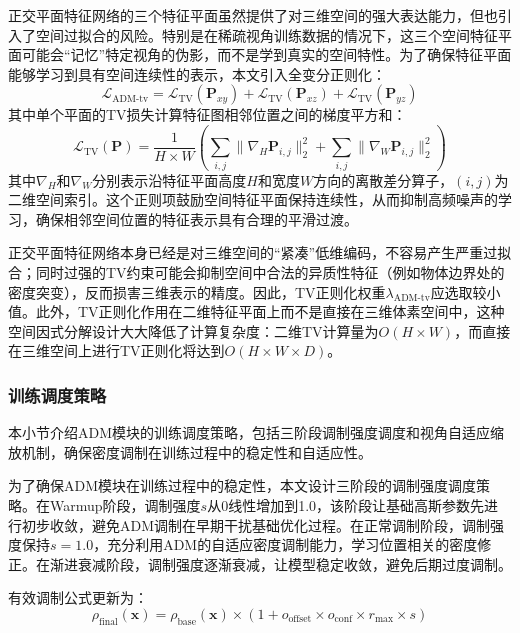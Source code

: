 正交平面特征网络的三个特征平面虽然提供了对三维空间的强大表达能力，但也引入了空间过拟合的风险。特别是在稀疏视角训练数据的情况下，这三个空间特征平面可能会“记忆”特定视角的伪影，而不是学到真实的空间特性。为了确保特征平面能够学习到具有空间连续性的表示，本文引入全变分正则化：
\begin{equation}
\mathcal{L}_{\text{ADM-tv}} = \mathcal{L}_{\text{TV}}(\mathbf{P}_{xy}) + \mathcal{L}_{\text{TV}}(\mathbf{P}_{xz}) + \mathcal{L}_{\text{TV}}(\mathbf{P}_{yz})
\end{equation}
其中单个平面的TV损失计算特征图相邻位置之间的梯度平方和：
\begin{equation}
\mathcal{L}_{\text{TV}}(\mathbf{P}) = \frac{1}{H \times W} \left( \sum_{i,j} \|\nabla_H \mathbf{P}_{i,j}\|_2^2 + \sum_{i,j} \|\nabla_W \mathbf{P}_{i,j}\|_2^2 \right)
\end{equation}
其中$\nabla_H$和$\nabla_W$分别表示沿特征平面高度$H$和宽度$W$方向的离散差分算子，$(i,j)$为二维空间索引。这个正则项鼓励空间特征平面保持连续性，从而抑制高频噪声的学习，确保相邻空间位置的特征表示具有合理的平滑过渡。

正交平面特征网络本身已经是对三维空间的“紧凑”低维编码，不容易产生严重过拟合；同时过强的TV约束可能会抑制空间中合法的异质性特征（例如物体边界处的密度突变），反而损害三维表示的精度。因此，TV正则化权重$\lambda_{\text{ADM-tv}}$应选取较小值。此外，TV正则化作用在二维特征平面上而不是直接在三维体素空间中，这种空间因式分解设计大大降低了计算复杂度：二维TV计算量为$O(H \times W)$，而直接在三维空间上进行TV正则化将达到$O(H \times W \times D)$。

\subsubsection{训练调度策略}

本小节介绍ADM模块的训练调度策略，包括三阶段调制强度调度和视角自适应缩放机制，确保密度调制在训练过程中的稳定性和自适应性。

为了确保ADM模块在训练过程中的稳定性，本文设计三阶段的调制强度调度策略。在Warmup阶段，调制强度$s$从0线性增加到1.0，该阶段让基础高斯参数先进行初步收敛，避免ADM调制在早期干扰基础优化过程。在正常调制阶段，调制强度保持$s = 1.0$，充分利用ADM的自适应密度调制能力，学习位置相关的密度修正。在渐进衰减阶段，调制强度逐渐衰减，让模型稳定收敛，避免后期过度调制。

有效调制公式更新为：
\begin{equation}
\rho_{\text{final}}(\mathbf{x}) = \rho_{\text{base}}(\mathbf{x}) \times (1 + o_{\text{offset}} \times o_{\text{conf}} \times r_{\text{max}} \times s)
\end{equation}

